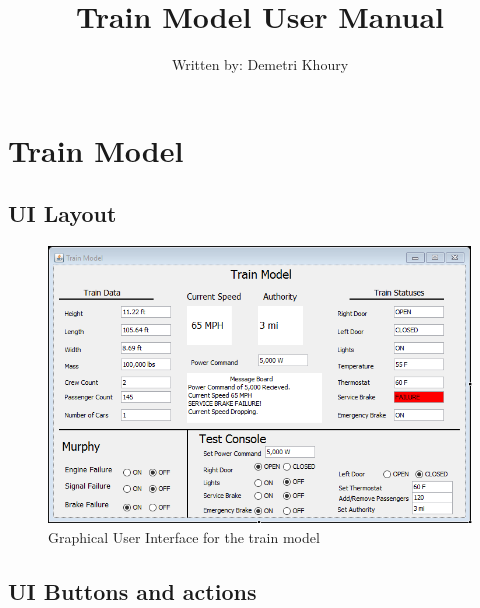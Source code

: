 











\title{Train Model User Manual}
\author{Written by: Demetri Khoury}
\date{}

\maketitle


\section{Train Model}

\subsection{UI Layout}

\begin{figure} [h!]
	\center
	\includegraphics[width=16cm]{trainmodel_gui}
	\caption{Graphical User Interface for the train model}
\end{figure}


\subsection{UI Buttons and actions}
	

